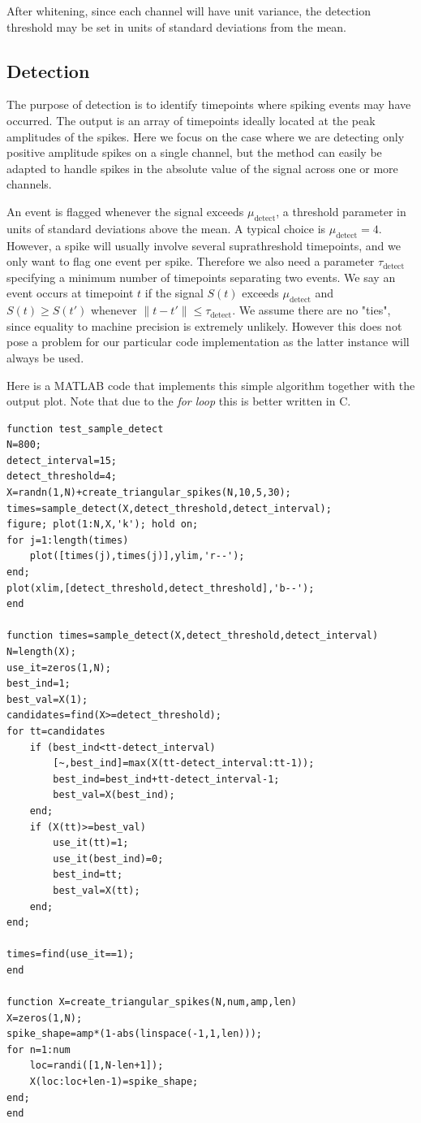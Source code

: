 \documentclass{article}
\begin{document}
After whitening, since each channel will have unit variance, the detection threshold may be set in units of standard deviations from the mean.

\subsection{Detection}

The purpose of detection is to identify timepoints where spiking events may have occurred. The output is an array of timepoints ideally located at the peak amplitudes of the spikes. Here we focus on the case where we are detecting only positive amplitude spikes on a single channel, but the method can easily be adapted to handle spikes in the absolute value of the signal across one or more channels.

An event is flagged whenever the signal exceeds $\mu_{\text{detect}}$, a threshold parameter in units of standard deviations above the mean. A typical choice is $\mu_{\text{detect}}=4$. However, a spike will usually involve several suprathreshold timepoints, and we only want to flag one event per spike. Therefore we also need a parameter $\tau_{\text{detect}}$ specifying a minimum number of timepoints separating two events. We say an event occurs at timepoint $t$ if the signal $S(t)$ exceeds
$\mu_{\text{detect}}$ and $S(t)\geq S(t')$ whenever $\|t-t'\|\leq \tau_{\text{detect}}$. We assume there are no "ties", since equality to machine precision is extremely unlikely. However this does not pose a problem for our particular code implementation as the latter instance will always be used.

Here is a MATLAB code that implements this simple algorithm together with the output plot. Note that due to the \emph{for loop} this is better written in C.

\begin{lstlisting}
function test_sample_detect
N=800;
detect_interval=15;
detect_threshold=4;
X=randn(1,N)+create_triangular_spikes(N,10,5,30);
times=sample_detect(X,detect_threshold,detect_interval);
figure; plot(1:N,X,'k'); hold on;
for j=1:length(times)
    plot([times(j),times(j)],ylim,'r--');
end;
plot(xlim,[detect_threshold,detect_threshold],'b--');
end

function times=sample_detect(X,detect_threshold,detect_interval)
N=length(X);
use_it=zeros(1,N);
best_ind=1;
best_val=X(1);
candidates=find(X>=detect_threshold);
for tt=candidates
    if (best_ind<tt-detect_interval)
        [~,best_ind]=max(X(tt-detect_interval:tt-1));
        best_ind=best_ind+tt-detect_interval-1;
        best_val=X(best_ind);
    end;
    if (X(tt)>=best_val)
        use_it(tt)=1;
        use_it(best_ind)=0;
        best_ind=tt;
        best_val=X(tt);
    end;
end;

times=find(use_it==1);
end

function X=create_triangular_spikes(N,num,amp,len)
X=zeros(1,N);
spike_shape=amp*(1-abs(linspace(-1,1,len)));
for n=1:num
    loc=randi([1,N-len+1]);
    X(loc:loc+len-1)=spike_shape;
end;
end
\end{lstlisting}
\end{document}

